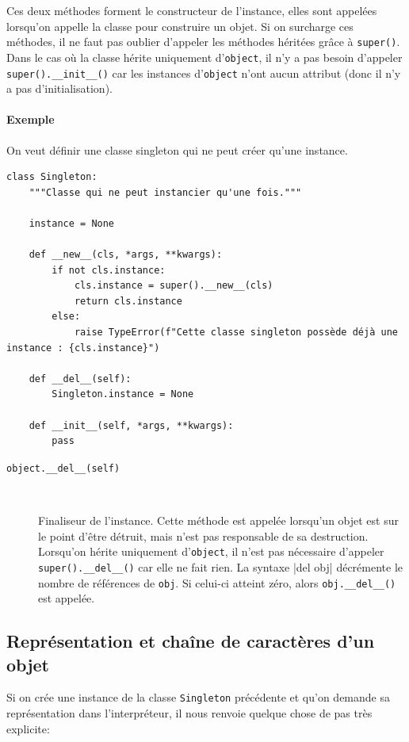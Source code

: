 \documentclass[a4paper, 10pt]{article}
\begin{document}
Ces deux méthodes forment le constructeur\label{constructeur} de l'instance, elles sont appelées lorsqu'on appelle la classe pour construire un objet. Si on surcharge ces méthodes, il ne faut pas oublier d'appeler les méthodes héritées grâce à \texttt{super()}. Dans le cas où la classe hérite uniquement d'\texttt{object}, il n'y a pas besoin d'appeler \texttt{super().__init__()} car les instances d'\texttt{object} n'ont aucun attribut (donc il n'y a pas d'initialisation).

\paragraph{Exemple} On veut définir une classe \og singleton \fg{} qui ne peut créer qu'une instance.

\begin{verbatim}
class Singleton:
    """Classe qui ne peut instancier qu'une fois."""

    instance = None

    def __new__(cls, *args, **kwargs):
        if not cls.instance:
            cls.instance = super().__new__(cls)
            return cls.instance
        else:
            raise TypeError(f"Cette classe singleton possède déjà une instance : {cls.instance}")

    def __del__(self):
        Singleton.instance = None

    def __init__(self, *args, **kwargs):
        pass
\end{verbatim}

\begin{description}
    \item[\texttt{object.__del__(self)}]~

    Finaliseur de l'instance. Cette méthode est appelée lorsqu'un objet est sur le point d'être détruit, mais n'est pas responsable de sa destruction. Lorsqu'on hérite uniquement d'\texttt{object}, il n'est pas nécessaire d'appeler \texttt{super().__del__()} car elle ne fait rien. La syntaxe |del obj| décrémente le nombre de références de \texttt{obj}. Si celui-ci atteint zéro, alors \texttt{obj.__del__()} est appelée.
\end{description}

\subsection{Représentation et chaîne de caractères d'un objet}
Si on crée une instance de la classe \texttt{Singleton} précédente et qu'on demande sa représentation dans l'interpréteur, il nous renvoie quelque chose de pas très explicite:
\end{document}
